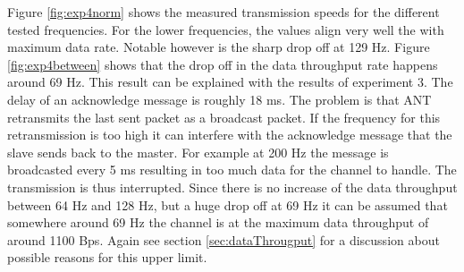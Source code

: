 \begin{description}
	Figure \ref{fig:exp4norm} shows the measured transmission speeds for the different tested frequencies. For the lower frequencies, the values align very well the with maximum data rate. Notable however is the sharp drop off at 129 Hz. Figure \ref{fig:exp4between} shows
	that the drop off in the data throughput rate happens around 69 Hz. This result can be explained with the results of experiment 3. The delay of an acknowledge message is roughly 18 ms. The problem is that ANT retransmits the last sent packet as a broadcast packet. If the frequency for this retransmission is too high it can interfere with the acknowledge message that the slave sends back to the master. For example at 200 Hz the message is broadcasted every 5 ms resulting in too much data for the channel to handle. The transmission is thus interrupted. Since there is no increase of the data throughput between 64 Hz and 128 Hz, but a huge drop off at 69 Hz it can be assumed that somewhere around 69 Hz the channel is at the maximum data throughput of around 1100 Bps. Again see section \ref{sec:dataThrougput} for a discussion about possible reasons for this upper limit. 

\end{description}
\newpage

